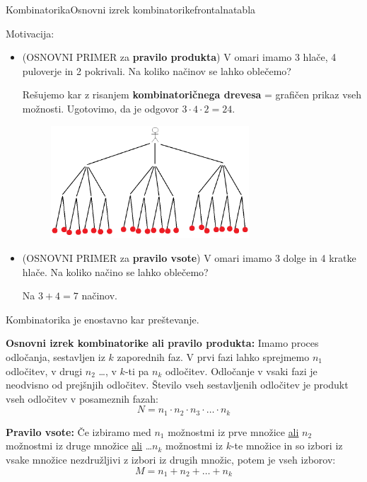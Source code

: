 \begin{priprava}{}{}{Kombinatorika}{Osnovni izrek kombinatorike}{frontalna}{tabla}

Motivacija:
\begin{itemize}
    \item (OSNOVNI PRIMER za \textbf{pravilo produkta}) V omari imamo 3 hlače, 4 puloverje in 2 pokrivali. Na koliko načinov se lahko oblečemo?
    
    Rešujemo kar z risanjem \textbf{kombinatoričnega drevesa} = grafičen prikaz vseh možnosti. Ugotovimo, da je odgovor $ 3 \cdot 4 \cdot 2 = 24 $.

    \begin{figure}[h]
        \centering
        \includegraphics[width=0.7\textwidth]{slike/produkt.png}
    \end{figure}

    \item (OSNOVNI PRIMER za \textbf{pravilo vsote}) V omari imamo 3 dolge in 4 kratke hlače. Na koliko načino se lahko oblečemo?
    
    Na $ 3 + 4 = 7 $ načinov.
\end{itemize}

Kombinatorika je enostavno kar preštevanje.


\textbf{Osnovni izrek kombinatorike ali pravilo produkta:} Imamo proces odločanja, sestavljen iz $ k $ zaporednih faz. V prvi fazi lahko sprejmemo $ n_1 $ odločitev, v drugi $ n_2 $ \ldots, v $ k $-ti pa $ n_k $ odločitev. Odločanje v vsaki fazi je neodvisno od prejšnjih odločitev. Število vseh sestavljenih odločitev je produkt vseh odločitev v posameznih fazah:
$$ N = n_1 \cdot n_2 \cdot n_3 \cdot \ldots \cdot n_k $$

\textbf{Pravilo vsote:} Če izbiramo med $ n_1 $ možnostmi iz prve množice \underline{ali} $ n_2 $ možnostmi iz druge množice \underline{ali} \ldots $ n_k $ možnostmi iz $ k $-te množice in so izbori iz vsake množice nezdružljivi z izbori iz drugih množic, potem je vseh izborov:
$$ M = n_1 + n_ 2 + \ldots + n_k $$


\end{priprava}
